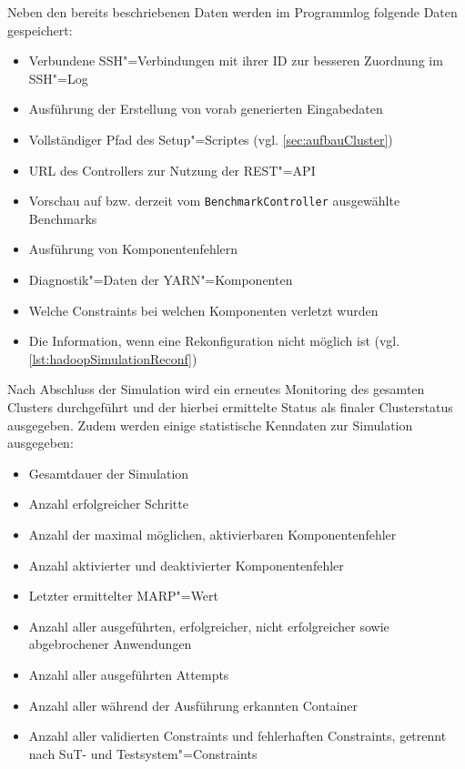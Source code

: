 Neben den bereits beschriebenen Daten werden im Programmlog folgende Daten gespeichert:

\begin{itemize}
    \item Verbundene SSH"=Verbindungen mit ihrer ID zur besseren Zuordnung im SSH"=Log
    \item Ausführung der Erstellung von vorab generierten Eingabedaten
    \item Vollständiger Pfad des Setup"=Scriptes (vgl. \autoref{sec:aufbauCluster})
    \item URL des Controllers zur Nutzung der REST"=API
    \item Vorschau auf bzw. derzeit vom \texttt{BenchmarkController} ausgewählte Benchmarks
    \item Ausführung von Komponentenfehlern
    \item Diagnostik"=Daten der YARN"=Komponenten
    \item Welche Constraints bei welchen Komponenten verletzt wurden
    \item Die Information, wenn eine Rekonfiguration nicht möglich ist (vgl. \autoref{lst:hadoopSimulationReconf})
\end{itemize}

Nach Abschluss der Simulation wird ein erneutes Monitoring des gesamten Clusters durchgeführt und der hierbei ermittelte Status als finaler Clusterstatus ausgegeben.
Zudem werden einige statistische Kenndaten zur Simulation ausgegeben:

\begin{itemize}
    \item Gesamtdauer der Simulation
    \item Anzahl erfolgreicher Schritte
    \item Anzahl der maximal möglichen, aktivierbaren Komponentenfehler
    \item Anzahl aktivierter und deaktivierter Komponentenfehler
    \item Letzter ermittelter \ac{MARP}"=Wert
    \item Anzahl aller ausgeführten, erfolgreicher, nicht erfolgreicher sowie abgebrochener Anwendungen
    \item Anzahl aller ausgeführten Attempts
    \item Anzahl aller während der Ausführung erkannten Container
    \item Anzahl aller validierten Constraints und fehlerhaften Constraints, getrennt nach \ac{SuT}- und Testsystem"=Constraints
\end{itemize}

